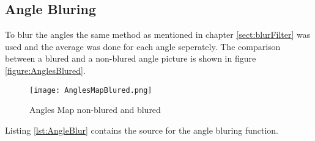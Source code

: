 \subsection{Angle Bluring}

To blur the angles the same method as mentioned in chapter \vref{sect:blurFilter} was used and
the average was done for each angle seperately. The comparison between a blured and a non-blured
angle picture is shown in figure \vref{figure:AnglesBlured}.

\begin{figure}[htp]
\begin{center}
  \texttt{[image: AnglesMapBlured.png]}
  \caption{Angles Map non-blured and blured}
  \label{figure:AnglesBlured}
\end{center}
\end{figure}




Listing \vref{lst:AngleBlur} contains the source for the angle bluring function.

